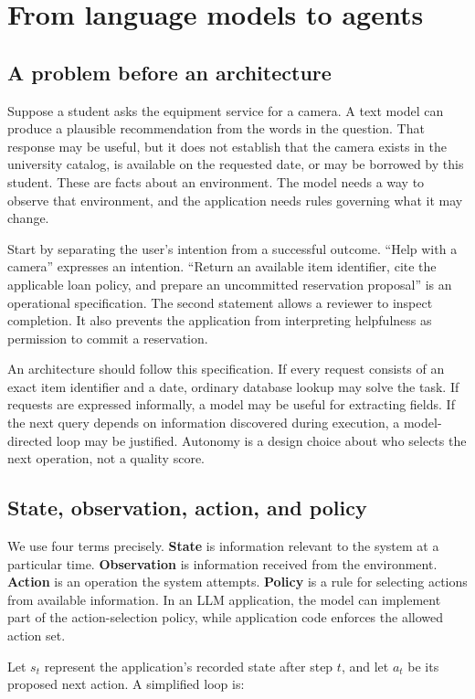 \chapter{From language models to agents}
\section{A problem before an architecture}
Suppose a student asks the equipment service for a camera. A text model can produce a plausible recommendation from the words in the question. That response may be useful, but it does not establish that the camera exists in the university catalog, is available on the requested date, or may be borrowed by this student. These are facts about an environment. The model needs a way to observe that environment, and the application needs rules governing what it may change.

Start by separating the user's intention from a successful outcome. “Help with a camera” expresses an intention. “Return an available item identifier, cite the applicable loan policy, and prepare an uncommitted reservation proposal” is an operational specification. The second statement allows a reviewer to inspect completion. It also prevents the application from interpreting helpfulness as permission to commit a reservation.

An architecture should follow this specification. If every request consists of an exact item identifier and a date, ordinary database lookup may solve the task. If requests are expressed informally, a model may be useful for extracting fields. If the next query depends on information discovered during execution, a model-directed loop may be justified. Autonomy is a design choice about who selects the next operation, not a quality score.

\section{State, observation, action, and policy}
We use four terms precisely. \textbf{State} is information relevant to the system at a particular time. \textbf{Observation} is information received from the environment. \textbf{Action} is an operation the system attempts. \textbf{Policy} is a rule for selecting actions from available information. In an LLM application, the model can implement part of the action-selection policy, while application code enforces the allowed action set.

Let \(s_t\) represent the application's recorded state after step \(t\), and let \(a_t\) be its proposed next action. A simplified loop is:

